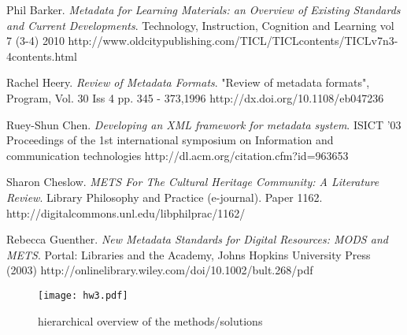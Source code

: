\begin{thebibliography}{99}
Phil Barker.
\newblock \emph{Metadata for Learning Materials: an Overview of Existing Standards and Current Developments}.
\newblock Technology, Instruction, Cognition and Learning vol 7 (3-4) 2010
\newblock http://www.oldcitypublishing.com/TICL/TICLcontents/TICLv7n3-4contents.html


Rachel Heery.
\newblock \emph{Review of Metadata Formats}.
\newblock "Review of metadata formats", Program, Vol. 30 Iss 4 pp. 345 - 373,1996
\newblock http://dx.doi.org/10.1108/eb047236

Ruey-Shun Chen.
\newblock \emph{Developing an XML framework for metadata system}.
\newblock ISICT '03 Proceedings of the 1st international symposium on Information and communication technologies
\newblock http://dl.acm.org/citation.cfm?id=963653

Sharon Cheslow.
\newblock \emph{METS For The Cultural Heritage Community: A	Literature Review}.
\newblock Library Philosophy and Practice (e-journal). Paper 1162.
\newblock http://digitalcommons.unl.edu/libphilprac/1162/

Rebecca Guenther.
\newblock \emph{New Metadata Standards for Digital Resources: MODS and METS}.
\newblock Portal: Libraries and the Academy, Johns Hopkins University Press (2003)
\newblock http://onlinelibrary.wiley.com/doi/10.1002/bult.268/pdf

\end{thebibliography}


\clearpage %

\begin{figure*}[p] %
	\begin{center}
		\texttt{[image: hw3.pdf]}
	\end{center}
	\caption{hierarchical overview of the methods/solutions}
	\label{fig:hw3}
\end{figure*}



